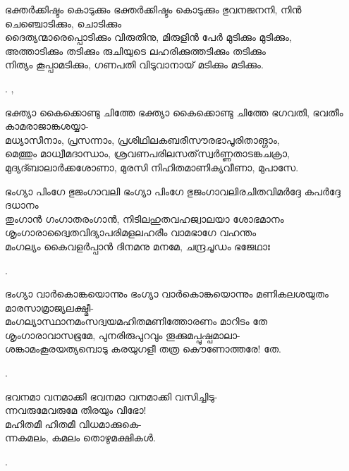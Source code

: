 \begin{enumerate}

\begin{slokam}{\VSr}{\SVL}{ഭക്തർക്കിഷ്ടം കൊടുക്കും}
ഭക്തർക്കിഷ്ടം കൊടുക്കും ഭുവനജനനി, നിൻ ചെഞ്ചൊടിക്കും, ചൊടിക്കും\\
ദൈത്യന്മാരെപ്പൊടിക്കും വിരുതിനു, മിരുളിൻ പേർ മുടിക്കും മുടിക്കും,\\
അത്താടിക്കും തടിക്കും രുചിയുടെ ലഹരിക്കുത്തടിക്കും തടിക്കും\\
നിത്യം കൂപ്പാമടിക്കും, ഗണപതി വിടുവാനായ്‌ മടിക്കും മടിക്കും.
\end{slokam}


.  ,


\begin{slokam}{\VSr}{\Unk}{ഭക്ത്യാ കൈക്കൊണ്ടു ചിത്തേ}
ഭക്ത്യാ കൈക്കൊണ്ടു ചിത്തേ ഭഗവതി, ഭവതീം കാമരാജാങ്കശയ്യാ-\\
മധ്യാസീനാം, പ്രസന്നാം, പ്രശിഥിലകബരീസൗരഭാപൂരിതാങ്ഗാം,\\
മെത്തും മാധ്വീമദാന്ധാം, ശ്രവണപരിലസത്‌സ്വർണ്ണതാടങ്കചക്രാ,\\
മുദ്യദ്ബാലാർക്കശോണാ, മുരസി നിഹിതമാണിക്യവീണാ, മുപാസേ.
\end{slokam}


\begin{slokam}{\VSr}{\Mazha}{ഭംഗ്യാ പിംഗേ ഭുജംഗാവലി}
ഭംഗ്യാ പിംഗേ ഭുജംഗാവലിരചിതവിമർദ്ദേ കപർദ്ദേ ദധാനം\\
തുംഗാൻ ഗംഗാതരംഗാൻ, നിടിലഹുതവഹജ്വാലയാ ശോഭമാനം\\
ശൃംഗാരാദ്വൈതവിദ്യാപരിമളലഹരീം വാമഭാഗേ വഹന്തം\\
മംഗല്യം കൈവളർപ്പാൻ ദിനമനു മനമേ, ചന്ദ്രചൂഡം ഭജേഥാഃ
\end{slokam}


.


\begin{slokam}{\VSr}{\Unk}{ഭംഗ്യാ വാർകൊങ്കയൊന്നും}
ഭംഗ്യാ വാർകൊങ്കയൊന്നും മണികലശയുതം മാരസാമ്രാജ്യലക്ഷ്മീ-\\
മംഗല്യാസ്ഥാനമംസദ്വയമഹിതമണിത്തോരണം മാറിടം തേ\\
ശൃംഗാരാവാസഭൂമേ, പുനരിരുപുറവും തൂക്കുമപ്പുഷ്പമാലാ-\\
ശങ്കാമംകൂരയത്യമ്പൊടു കരയുഗളീ തത്ര കൌണോത്തരേ! തേ.
\end{slokam}


.


\begin{slokam}{\VDv}{\VCBP}{ഭവനമാ വനമാക്കി}
ഭവനമാ വനമാക്കി വസിച്ചിടു-\\
ന്നവരുമേവരുമേ തിരയും വിഭോ!\\
മഹിതമീ ഹിതമീ വിധമാക്കുകെ-\\
ന്നകമലം, കമലം തൊഴുമക്ഷികള്‍.
\end{slokam}


.  

\end{enumerate}


